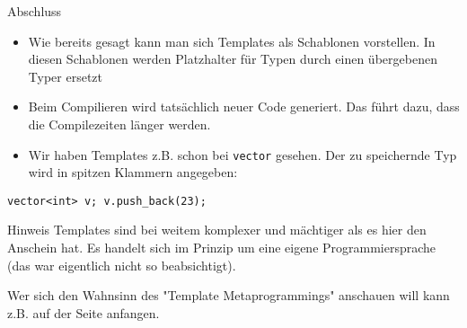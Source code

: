 \documentclass[presentation]{beamer}
\begin{document}
\begin{frame}[fragile,label={sec:org3a77d6d}]{Abschluss}
 \begin{itemize}
\item Wie bereits gesagt kann man sich Templates als \alert{Schablonen}
vorstellen. In diesen Schablonen werden Platzhalter für Typen durch
einen übergebenen Typer ersetzt
\item Beim Compilieren wird tatsächlich \alert{neuer Code generiert}. Das führt
dazu, dass die Compilezeiten länger werden.
\item Wir haben Templates z.B. schon bei {\color{solarizedYellow}\texttt{vector} }gesehen. Der zu
speichernde Typ wird in spitzen Klammern angegeben:
\end{itemize}
\begin{verbatim}
vector<int> v; v.push_back(23);
\end{verbatim}
\begin{block}{Hinweis}
Templates sind bei weitem komplexer und mächtiger als es hier den
Anschein hat. Es handelt sich im Prinzip um eine eigene
Programmiersprache (das war eigentlich nicht so beabsichtigt).

Wer sich den Wahnsinn des "\alert{Template Metaprogrammings}" anschauen will
kann z.B. auf der \uline{\href{https://en.wikipedia.org/wiki/Template\_metaprogramming}{\color{blue}{Wikipedia}}} Seite anfangen.
\end{block}
\end{frame}
\end{document}
